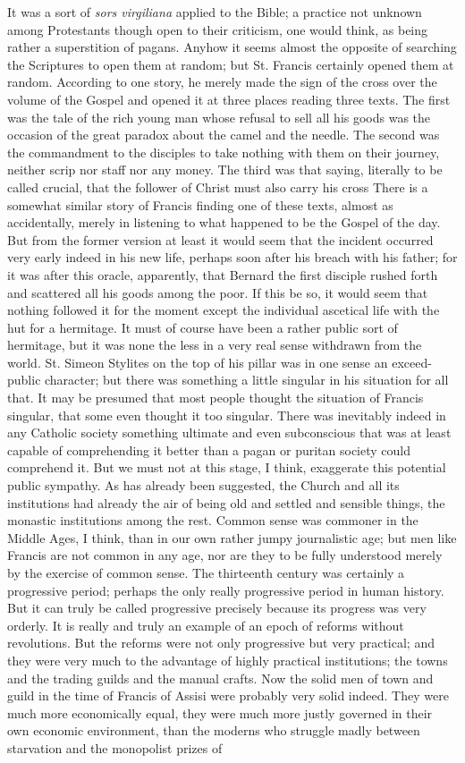 \documentclass{book}
\begin{document}
It was a sort of \emph{sors virgiliana} applied to the Bible; a practice not unknown among Protestants though open to their criticism, one would think, as being rather a superstition of pagans. Anyhow it seems almost the opposite of searching the Scriptures to open them at random; but St. Francis certainly opened them at random. According to one story, he merely made the sign of the cross over the volume of the Gospel and opened it at three places reading three texts. The first was the tale of the rich young man whose refusal to sell all his goods was the occasion of the great paradox about the camel and the needle. The second was the commandment to the disciples to take nothing with them on their journey, neither scrip nor staff nor any money. The third was that saying, literally to be called crucial, that the follower of Christ must also carry his cross There is a somewhat similar story of Francis finding one of these texts, almost as accidentally, merely in listening to what happened to be the Gospel of the day. But from the former version at least it would seem that the incident occurred very early indeed in his new life, perhaps soon after his breach with his father; for it was after this oracle, apparently, that Bernard the first disciple rushed forth and scattered all his goods among the poor. If this be so, it would seem that nothing followed it for the moment except the individual ascetical life with the hut for a hermitage. It must of course have been a rather public sort of hermitage, but it was none the less in a very real sense withdrawn from the world. St. Simeon Stylites on the top of his pillar was in one sense an exceed-public character; but there was something a little singular in his situation for all that. It may be presumed that most people thought the situation of Francis singular, that some even thought it too singular. There was inevitably indeed in any Catholic society something ultimate and even subconscious that was at least capable of comprehending it better than a pagan or puritan society could comprehend it. But we must not at this stage, I think, exaggerate this potential public sympathy. As has already been suggested, the Church and all its institutions had already the air of being old and settled and sensible things, the monastic institutions among the rest. Common sense was commoner in the Middle Ages, I think, than in our own rather jumpy journalistic age; but men like Francis are not common in any age, nor are they to be fully understood merely by the exercise of common sense. The thirteenth century was certainly a progressive period; perhaps the only really progressive period in human history. But it can truly be called progressive precisely because its progress was very orderly. It is really and truly an example of an epoch of reforms without revolutions. But the reforms were not only progressive but very practical; and they were very much to the advantage of highly practical institutions; the towns and the trading guilds and the manual crafts. Now the solid men of town and guild in the time of Francis of Assisi were probably very solid indeed. They were much more economically equal, they were much more justly governed in their own economic environment, than the moderns who struggle madly between starvation and the monopolist prizes of 
\end{document}
